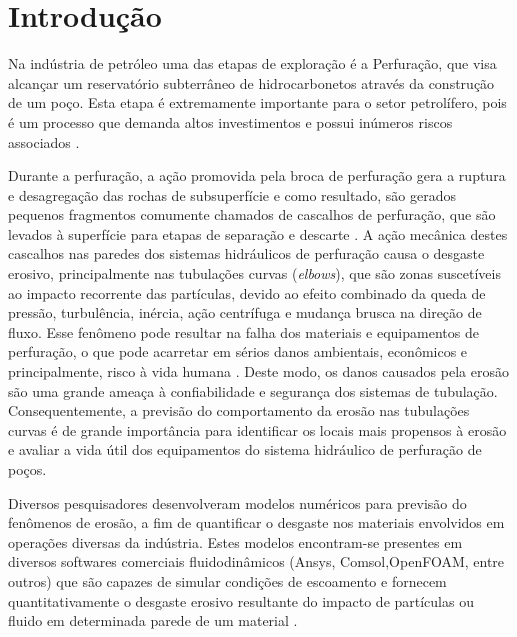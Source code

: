 
\chapter[Introdução]{Introdução}

Na indústria de petróleo uma das etapas de exploração é a Perfuração, que visa alcançar um reservatório subterrâneo de hidrocarbonetos através da construção de um poço. Esta etapa é extremamente importante para o setor petrolífero, pois é um processo que demanda altos investimentos e possui inúmeros riscos associados \cite{rocha2016projetos}. 

Durante a perfuração, a ação promovida pela broca de perfuração gera a ruptura e desagregação das rochas de subsuperfície e como resultado, são gerados pequenos fragmentos comumente chamados de cascalhos de perfuração, que são levados à superfície para etapas de separação e descarte \cite{thomas}. A ação mecânica destes cascalhos nas paredes dos sistemas hidráulicos de perfuração causa o desgaste erosivo, principalmente nas tubulações curvas (\textit{elbows}), que são zonas suscetíveis ao impacto recorrente das partículas, devido ao efeito combinado da queda de pressão, turbulência, inércia, ação centrífuga e mudança brusca na direção de fluxo. Esse fenômeno pode resultar na falha dos materiais e equipamentos de perfuração, o que pode acarretar em sérios danos ambientais, econômicos e principalmente, risco à vida humana \cite{WANG}. Deste modo, os danos causados pela erosão são uma grande ameaça à confiabilidade e segurança dos sistemas de tubulação. Consequentemente, a previsão do comportamento da erosão nas tubulações curvas é de grande importância para identificar os locais mais propensos à erosão e avaliar a vida útil dos equipamentos do sistema hidráulico de perfuração de poços. 

Diversos pesquisadores desenvolveram modelos numéricos para previsão do fenômenos de erosão, a fim de quantificar o desgaste nos materiais envolvidos em operações diversas da indústria. Estes modelos encontram-se presentes em diversos softwares comerciais fluidodinâmicos (Ansys, Comsol,OpenFOAM, entre outros) que são capazes de simular condições de escoamento e fornecem quantitativamente o desgaste erosivo resultante do impacto de partículas ou fluido em determinada parede de um material \cite{oka} \cite{dnv} \cite{finnie} \cite{maclaury}. 

